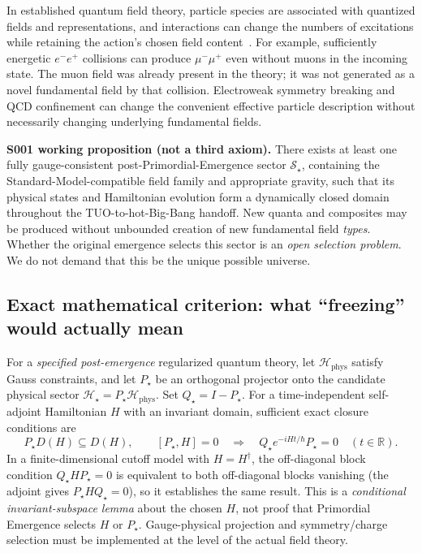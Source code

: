 \documentclass[11pt,a4paper]{article}
\theoremstyle{tmon}
\theoremstyle{definition}
\begin{document}
In established quantum field theory, particle species are associated with quantized fields and representations, and interactions can change the numbers of excitations while retaining the action's chosen field content~\cite{CERNStandardModel,PDGHot2025}. For example, sufficiently energetic $e^-e^+$ collisions can produce $\mu^-\mu^+$ even without muons in the incoming state. The muon field was already present in the theory; it was not generated as a novel fundamental field by that collision. Electroweak symmetry breaking and QCD confinement can change the convenient effective particle description without necessarily changing underlying fundamental fields.

\begin{keybox}
\textbf{S001 working proposition (not a third axiom).} There exists at least one fully gauge-consistent post-Primordial-Emergence sector $\mathscr S_\star$, containing the Standard-Model-compatible field family and appropriate gravity, such that its physical states and Hamiltonian evolution form a dynamically closed domain throughout the TUO-to-hot-Big-Bang handoff. New quanta and composites may be produced without unbounded creation of new fundamental field \emph{types}. Whether the original emergence selects this sector is an \emph{open selection problem}. We do not demand that this be the unique possible universe.
\end{keybox}

\subsection{Exact mathematical criterion: what ``freezing'' would actually mean}
For a \emph{specified post-emergence} regularized quantum theory, let $\mathcal H_{\mathrm{phys}}$ satisfy Gauss constraints, and let $P_\star$ be an orthogonal projector onto the candidate physical sector $\mathcal H_\star=P_\star\mathcal H_{\mathrm{phys}}$. Set $Q_\star=I-P_\star$. For a time-independent self-adjoint Hamiltonian $H$ with an invariant domain, sufficient exact closure conditions are
\begin{equation}\label{eq:s001closure}
P_\star D(H)\subseteq D(H),\qquad [P_\star,H]=0
\quad\Longrightarrow\quad
Q_\star e^{-iHt/\hbar}P_\star=0\quad (t\in\mathbb R).
\end{equation}
In a finite-dimensional cutoff model with $H=H^\dagger$, the off-diagonal block condition $Q_\star H P_\star=0$ is equivalent to both off-diagonal blocks vanishing (the adjoint gives $P_\star H Q_\star=0$), so it establishes the same result. This is a \emph{conditional invariant-subspace lemma} about the chosen $H$, not proof that Primordial Emergence selects $H$ or $P_\star$. Gauge-physical projection and symmetry/charge selection must be implemented at the level of the actual field theory.
\end{document}
